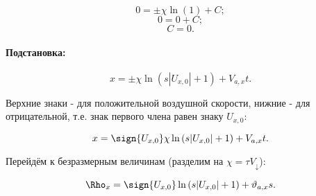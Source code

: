$$0 = \pm \chi \ln{(1)} + C;$$
$$0 = 0 + C;$$
$$C = 0.$$

\paragraph{Подстановка:}

$$x = \pm \chi \ln{( s|U_{x,0}| + 1 )} + V_{a,x}t.$$

Верхние знаки - для положительной воздушной скорости, нижние - для отрицательной, т.е. знак первого члена равен знаку $U_{x,0}$:

$$x = \sign{U_{x,0}} \chi \ln{( s|U_{x,0}| + 1 )} + V_{a,x}t.$$

Перейдём к безразмерным величинам (разделим на $\chi = \tau V_\downarrow$):

$$\Rho_x = \sign{U_{x,0}} \ln{( s|U_{x,0}| + 1 )} + \vartheta_{a,x}s.$$
